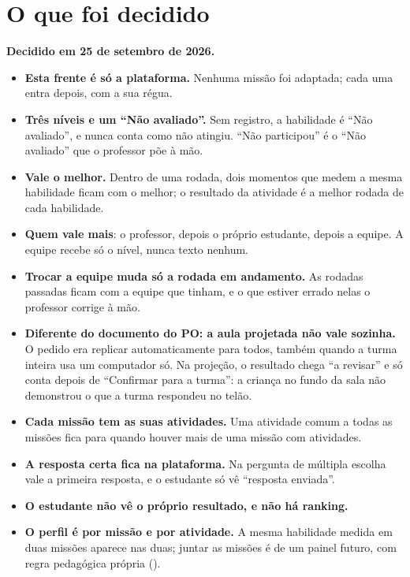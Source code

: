 \section{O que foi decidido}

\begin{decisao}
\textbf{Decidido em 25 de setembro de 2026.}
\begin{itemize}
  \item \textbf{Esta frente é só a plataforma.} Nenhuma missão foi adaptada; cada
    uma entra depois, com a sua régua.
  \item \textbf{Três níveis e um \enquote{Não avaliado}.} Sem registro, a
    habilidade é \enquote{Não avaliado}, e nunca conta como não atingiu.
    \enquote{Não participou} é o \enquote{Não avaliado} que o professor põe à
    mão.
  \item \textbf{Vale o melhor.} Dentro de uma rodada, dois momentos que medem a
    mesma habilidade ficam com o melhor; o resultado da atividade é a melhor
    rodada de cada habilidade.
  \item \textbf{Quem vale mais}: o professor, depois o próprio estudante, depois
    a equipe. A equipe recebe só o nível, nunca texto nenhum.
  \item \textbf{Trocar a equipe muda só a rodada em andamento.} As rodadas
    passadas ficam com a equipe que tinham, e o que estiver errado nelas o
    professor corrige à mão.
  \item \textbf{Diferente do documento do PO: a aula projetada não vale
    sozinha.} O pedido era replicar automaticamente para todos, também quando a
    turma inteira usa um computador só. Na projeção, o resultado chega \enquote{a
    revisar} e só conta depois de \enquote{Confirmar para a turma}: a criança no
    fundo da sala não demonstrou o que a turma respondeu no telão.
  \item \textbf{Cada missão tem as suas atividades.} Uma atividade comum a todas
    as missões fica para quando houver mais de uma missão com atividades.
  \item \textbf{A resposta certa fica na plataforma.} Na pergunta de múltipla
    escolha vale a primeira resposta, e o estudante só vê \enquote{resposta
    enviada}.
  \item \textbf{O estudante não vê o próprio resultado, e não há ranking.}
  \item \textbf{O perfil é por missão e por atividade.} A mesma habilidade
    medida em duas missões aparece nas duas; juntar as missões é de um painel
    futuro, com regra pedagógica própria ().
\end{itemize}
\end{decisao}

